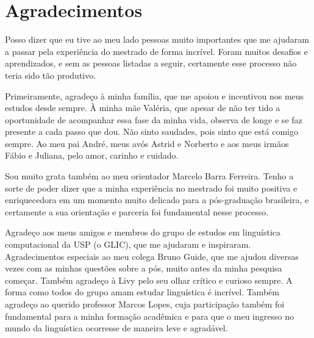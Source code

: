 \documentclass[12pt,twoside,a4paper]{book}
\begin{document}
\frontmatter 
\fancyhead[RO]{{\footnotesize\rightmark}\hspace{2em}\thepage}
\fancyhead[LE]{\thepage\hspace{2em}\footnotesize{\leftmark}}
\fancyhead[RE,LO]{}
\fancyhead[RO]{{\footnotesize\rightmark}\hspace{2em}\thepage}


\onehalfspacing  %


\makeatletter\@openrightfalse\makeatother
{}
 





\chapter*{Agradecimentos}

Posso dizer que eu tive ao meu lado pessoas muito importantes que me ajudaram a passar pela experiência do mestrado de forma incrível. Foram muitos desafios e aprendizados, e sem as pessoas listadas a seguir, certamente esse processo não teria sido tão produtivo. 

Primeiramente, agradeço à minha família, que me apoiou e incentivou nos meus estudos desde sempre. À minha mãe Valéria, que apesar de não ter tido a oportunidade de acompanhar essa fase da minha vida, observa de longe e se faz presente a cada passo que dou. Não sinto saudades, pois sinto que está comigo sempre. Ao meu pai André, meus avós Astrid e Norberto e aos meus irmãos Fábio e Juliana, pelo amor, carinho e cuidado.

Sou muito grata também ao meu orientador Marcelo Barra Ferreira. Tenho a sorte de poder dizer que a minha experiência no mestrado foi muito positiva e enriquecedora em um momento muito delicado para a pós-graduação brasileira, e certamente a sua orientação e parceria foi fundamental nesse processo.

Agradeço aos meus amigos e membros do grupo de estudos em linguística computacional da USP (o GLIC), que me ajudaram e inspiraram. Agradecimentos especiais ao meu colega Bruno Guide, que me ajudou diversas vezes com as minhas questões sobre a pós, muito antes da minha pesquisa começar. Também agradeço à Livy pelo seu olhar crítico e curioso sempre. A forma como todos do grupo amam estudar linguística é incrível. Também agradeço ao querido professor Marcos Lopes, cuja participação também foi fundamental para a minha formação acadêmica e para que o meu ingresso no mundo da linguística ocorresse de maneira leve e agradável.
\end{document}
